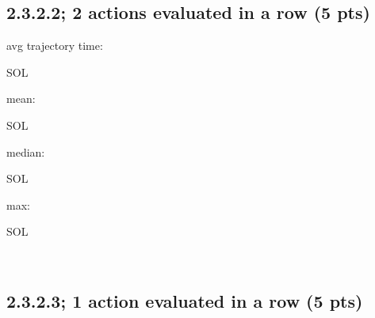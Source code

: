 \documentclass[12pt]{article}
\begin{document}
\subsection*{2.3.2.2; 2 actions evaluated in a row (5 pts)}

avg trajectory time: \begin{tcolorbox}[fit,height=1cm, width=2cm, blank, borderline={1pt}{1pt},nobeforeafter]
    \begin{center}
    \vspace{3mm}
    \large{SOL}
    \end{center}
\end{tcolorbox}
mean: \begin{tcolorbox}[fit,height=1cm, width=2cm, blank, borderline={1pt}{1pt},nobeforeafter]
    \begin{center}
    \vspace{3mm}
    \large{SOL}
    \end{center}
\end{tcolorbox}
median: \begin{tcolorbox}[fit,height=1cm, width=ahh2cm, blank, borderline={1pt}{1pt},nobeforeafter]
    \begin{center}
    \vspace{3mm}
    \large{SOL}
    \end{center}
\end{tcolorbox}
max: \begin{tcolorbox}[fit,height=1cm, width=2cm, blank, borderline={1pt}{1pt},nobeforeafter]
    \begin{center}
    \vspace{3mm}
    \large{SOL}
    \end{center}
\end{tcolorbox}
    \\

    
\subsection*{2.3.2.3; 1 action evaluated in a row (5 pts)}
\end{document}
